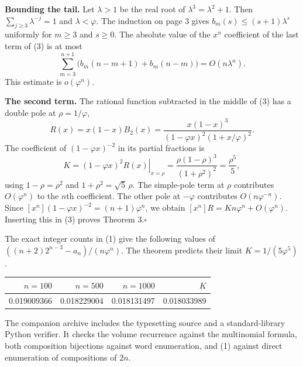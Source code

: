 \documentclass[12pt,letterpaper]{article}
\newcommand{\subhead}[1]{\vspace{1pt}{\large\sffamily\bfseries\color{ink}#1}\par}
\newcommand{\lead}[1]{\textbf{\color{ink}#1.}\enspace}
\newcommand{\qedx}{\hfill\(\square\)}
\newcommand{\source}[1]{\vfill{\small\color{muted}#1\par}}
\newcommand{\ph}{\varphi}
\begin{document}
\lead{Bounding the tail} Let $\lambda>1$ be the real root of
$\lambda^3=\lambda^2+1$. Then $\sum_{j\ge3}\lambda^{-j}=1$ and
$\lambda<\ph$. The induction on page 3 gives $b_m(s)\le (s+1)\lambda^s$
uniformly for $m\ge3$ and $s\ge0$. The absolute value of the $x^n$
coefficient of the last term of (3) is at most
\[
 \sum_{m=3}^{n+1} \bigl(b_m(n-m+1)+b_m(n-m)\bigr)=O(n\lambda^n).
\]
This estimate is $o(\ph^n)$.

\lead{The second term} The rational function subtracted in the middle of (3)
has a double pole at $\rho=1/\ph$,
\[
 R(x)=x(1-x)B_2(x)
 =\frac{x(1-x)^3}{(1-\ph x)^2(1+x/\ph)^2}.
\]
The coefficient of $(1-\ph x)^{-2}$ in its partial fractions is
\[
 K=\left.(1-\ph x)^2R(x)\right|_{x=\rho}
  =\frac{\rho(1-\rho)^3}{(1+\rho^2)^2}
  =\frac{\rho^5}{5},
\]
using $1-\rho=\rho^2$ and $1+\rho^2=\sqrt5\,\rho$. The simple-pole term at
$\rho$ contributes $O(\ph^n)$ to the $n$th coefficient. The other pole at
$-\ph$ contributes $O(n\ph^{-n})$. Since
$[x^n](1-\ph x)^{-2}=(n+1)\ph^n$, we obtain
$[x^n]R=Kn\ph^n+O(\ph^n)$. Inserting this in (3) proves Theorem 3.\qedx

\subhead{Numerical check}
The exact integer counts in (1) give the following values of
$((n+2)2^{n-3}-a_n)/(n\ph^n)$. The theorem predicts their limit
$K=1/(5\ph^5)$.

\begin{center}
\begin{tabular}{rrrr}
\toprule
$n=100$ & $n=500$ & $n=1000$ & $K$\\
\midrule
0.019009366 & 0.018229004 & 0.018131497 & 0.018033989\\
\bottomrule
\end{tabular}
\end{center}
\source{The companion archive includes the typesetting source and a standard-library
Python verifier. It checks the volume recurrence against the multinomial formula,
both composition bijections against word enumeration, and (1) against direct
enumeration of compositions of $2n$.}
\end{document}
